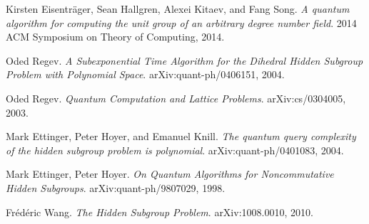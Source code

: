 \documentclass[12pt]{article}
\theoremstyle{plain}
\theoremstyle{definition}
\begin{document}
\newpage
%
\begin{thebibliography}{9}

 Kirsten Eisentr{\"a}ger, Sean Hallgren, Alexei Kitaev, and Fang Song.
 \emph{A quantum algorithm for computing the unit group of an arbitrary degree number field}. 2014 ACM Symposium on Theory of Computing, 2014.

 Oded Regev.
 \emph{A Subexponential Time Algorithm for the Dihedral Hidden Subgroup Problem with Polynomial Space}. arXiv:quant-ph/0406151, 2004.
 
 Oded Regev.
 \emph{Quantum Computation and Lattice Problems}. arXiv:cs/0304005, 2003.
 
 Mark Ettinger, Peter Hoyer, and Emanuel Knill.
 \emph{The quantum query complexity of the hidden subgroup problem is polynomial}. arXiv:quant-ph/0401083, 2004.
 
 Mark Ettinger, Peter Hoyer.
 \emph{On Quantum Algorithms for Noncommutative Hidden Subgroups}. arXiv:quant-ph/9807029, 1998.
 
 Fr\'{e}d\'{e}ric Wang.
 \emph{The Hidden Subgroup Problem}. arXiv:1008.0010, 2010.

\end{thebibliography}
%
\end{document}
